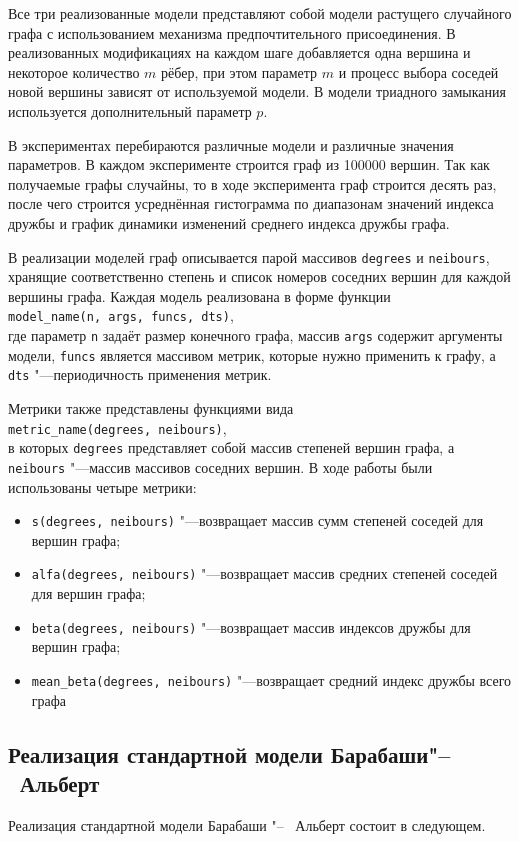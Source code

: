 \documentclass[bachelor, och, diploma]{SCWorks}
\begin{document}
Все три реализованные модели представляют собой модели растущего случайного графа с использованием механизма предпочтительного присоединения. В реализованных модификациях на каждом шаге добавляется одна вершина и некоторое количество $m$ рёбер, при этом параметр $m$ и процесс выбора соседей новой вершины зависят от используемой модели. В модели триадного замыкания используется дополнительный параметр $ p $. 

В экспериментах перебираются различные модели и различные значения параметров. В каждом эксперименте строится граф из 100000 вершин. Так как получаемые графы случайны, то в ходе эксперимента граф строится десять раз, после чего строится усреднённая гистограмма по диапазонам значений индекса дружбы и график динамики изменений среднего индекса дружбы графа.

В реализации моделей граф описывается парой массивов \texttt{degrees} и \texttt{neibours}, хранящие соответственно степень и список номеров соседних вершин для каждой вершины графа. Каждая модель реализована в форме функции\\ \texttt{model_name(n, args, funcs, dts)},\\ где параметр \texttt{n} задаёт размер конечного графа, массив \texttt{args} содержит аргументы модели, \texttt{funcs} является массивом метрик, которые нужно применить к графу, а \texttt{dts} "---периодичность применения метрик. 

Метрики также представлены функциями вида\\ \texttt{metric_name(degrees, neibours)},\\ в которых \texttt{degrees} представляет собой массив степеней вершин графа, а \texttt{neibours} "---массив массивов соседних вершин. В ходе работы были использованы четыре метрики:
\begin{itemize}
\item \texttt{s(degrees, neibours)} "---возвращает массив сумм степеней соседей для вершин графа;
\item \texttt{alfa(degrees, neibours)} "---возвращает массив средних степеней соседей для вершин графа;
\item \texttt{beta(degrees, neibours)} "---возвращает массив индексов дружбы для  вершин графа;
\item \texttt{mean_beta(degrees, neibours)} "---возвращает средний индекс дружбы всего графа
\end{itemize}
\subsection{Реализация стандартной модели Барабаши"--~Альберт}
Реализация стандартной модели Барабаши "--~ Альберт состоит в следующем. 
\end{document}

